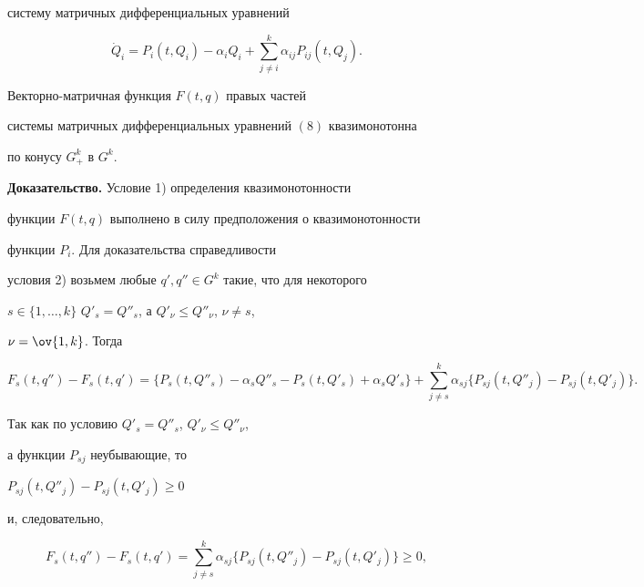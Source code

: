 систему матричных дифференциальных уравнений 


\begin{equation} 


\Dot Q_i=P_i(t,Q_i)-\alpha_i Q_i+\sum^k_{j\ne i} 


\alpha_{ij}P_{ij}(t,Q_j). 


\end{equation} 


 


\begin{lem} 


Векторно-матричная функция $F(t,q)$ правых частей 


системы матричных дифференциальных уравнений $(8)$ квазимонотонна 


по конусу $G^k_+$ в $G^k$. 


\end{lem} 


 


{\bf Доказательство.} Условие 1) определения квазимонотонности  


функции $F(t,q)$ выполнено в силу предположения о квазимонотонности 


функции $P_i$. Для доказательства справедливости  


условия 2) возьмем любые $q',q''\in G^k$ такие, что для некоторого  


$s\in\{1,\dotsc,k\}$\; $Q'_s=Q''_s$, а $Q'_\nu\le Q''_\nu$, $\nu\ne s$, 


$\nu=\ov{1,k}$. Тогда 


$$ 


F_s(t,q'')-F_s(t,q')=\{P_s(t,Q''_s)-\alpha_s Q''_s- 


P_s(t,Q'_s)+\alpha_s Q'_s\}+\sum^k_{j\ne s}\alpha_{sj} 


\{P_{sj}(t,Q''_j)-P_{sj}(t,Q'_j)\}. 


$$ 


Так как по условию $Q'_s=Q''_s$, $Q'_\nu\le Q''_\nu$, 


а функции $P_{sj}$ неубывающие, то 


$P_{sj}(t,Q''_j)-P_{sj}(t,Q'_j)\ge0$ 


и, следовательно, 


$$ 


F_s(t,q'')-F_s(t,q')=\sum^k_{j\ne s}\alpha_{sj}\{P_{sj}(t,Q''_j)- 


P_{sj}(t,Q'_j)\}\ge0, 


$$ 


